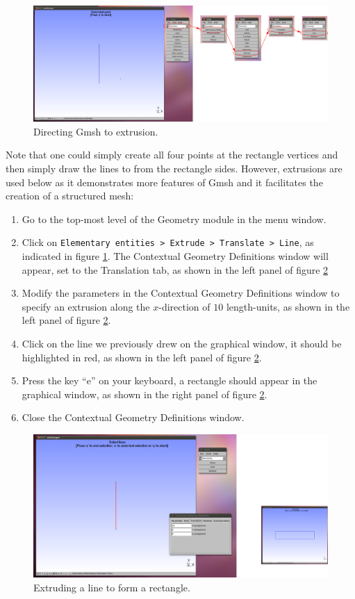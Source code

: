\begin{figure}[htbp]
 \centering
  \includegraphics[width=1.0\textwidth]{../figures/navigating_to_extrusion.png}
  \caption{Directing Gmsh to extrusion.}
  \label{fig:gmsh_extrusion}
\end{figure}
\par
Note that one could simply create all four points at the rectangle vertices and then simply draw the
lines to from the rectangle sides. However, extrusions  are used below as it demonstrates more features
of Gmsh and it facilitates the creation of a structured mesh:
\begin{enumerate}
  \item Go to the top-most level of the Geometry module in the menu window.
  \item Click on \lstinline{Elementary entities > Extrude > Translate > Line},
        as indicated in figure \ref{fig:gmsh_extrusion}. The Contextual Geometry Definitions window will
        appear, set to the Translation tab, as shown in the left panel of figure \ref{fig:extrusion}
  \item Modify the parameters in the Contextual Geometry Definitions window to specify an extrusion
        along the $x$-direction of $10$ length-units, as shown in the left panel of
        figure \ref{fig:extrusion}.
  \item Click on the line we previously drew on the graphical window, it should be highlighted in red,
        as shown in the left panel of figure \ref{fig:extrusion}.
  \item Press the key ``e'' on your keyboard, a rectangle should appear in the graphical window, as shown
        in the right panel of figure \ref{fig:extrusion}.
  \item Close the Contextual Geometry Definitions window.
\end{enumerate}
\begin{figure}[htbp]
 \centering
  \includegraphics[width=1.0\textwidth]{../figures/extrusion.png}
  \caption{Extruding a line to form a rectangle.}
  \label{fig:extrusion}
\end{figure}
